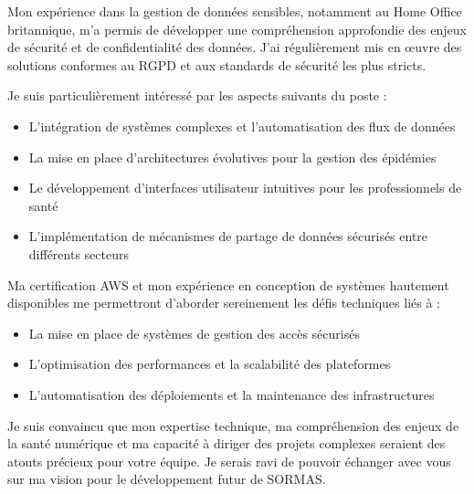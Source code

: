 \documentclass[11pt, a4paper]{awesome-cv}
\begin{document}
\begin{cvletter}
Mon expérience dans la gestion de données sensibles, notamment au Home Office britannique, m'a permis de développer une compréhension approfondie des enjeux de sécurité et de confidentialité des données. J'ai régulièrement mis en œuvre des solutions conformes au RGPD et aux standards de sécurité les plus stricts.

Je suis particulièrement intéressé par les aspects suivants du poste :


\begin{itemize}
\setlength\itemsep{-0.8em}
\item L'intégration de systèmes complexes et l'automatisation des flux de données
\item La mise en place d'architectures évolutives pour la gestion des épidémies
\item Le développement d'interfaces utilisateur intuitives pour les professionnels de santé
\item L'implémentation de mécanismes de partage de données sécurisés entre différents secteurs
\end{itemize}

Ma certification AWS et mon expérience en conception de systèmes hautement disponibles me permettront d'aborder sereinement les défis techniques liés à :

\begin{itemize}
\setlength\itemsep{-0.8em}
\item La mise en place de systèmes de gestion des accès sécurisés
\item L'optimisation des performances et la scalabilité des plateformes
\item L'automatisation des déploiements et la maintenance des infrastructures
\end{itemize}

Je suis convaincu que mon expertise technique, ma compréhension des enjeux de la santé numérique et ma capacité à diriger des projets complexes seraient des atouts précieux pour votre équipe. Je serais ravi de pouvoir échanger avec vous sur ma vision pour le développement futur de SORMAS.


\end{cvletter}


\makeletterclosing
\end{document}
